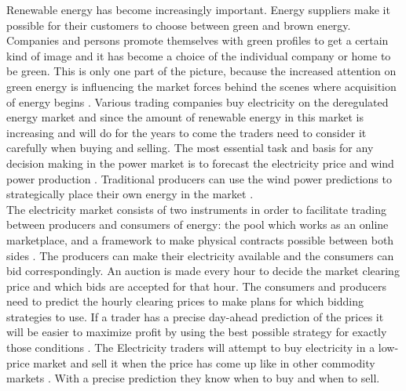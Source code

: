 Renewable energy has become increasingly important. Energy suppliers make it possible for their customers to choose between green and brown energy. Companies and persons promote themselves with green profiles to get a certain kind of image and it has become a choice of the individual company or home to be green. This is only one part of the picture, because the increased attention on green energy is influencing the market forces behind the scenes where acquisition of energy begins \cite{windPowerDanishLiberalized}. Various trading companies buy electricity on the deregulated energy market and since the amount of renewable energy in this market is increasing and will do for the years to come\cite{6, windPowerDanishLiberalized} the traders need to consider it carefully when buying and selling. The most essential task and basis for any decision making in the power market is to forecast the electricity price \cite{pjmForecast} and wind power production \cite{dayAheadImpactOfWindPowerForecasts}. Traditional producers can use the wind power predictions to strategically place their own energy in the market \cite{21}.
\\[0.5cm]
The electricity market consists of two instruments in order to facilitate trading between producers and consumers of energy: the pool which works as an online marketplace, and a framework to make physical contracts possible between both sides \cite{21}. The producers can make their electricity available and the consumers can bid correspondingly. An auction is made every hour to decide the market clearing price and which bids are accepted for that hour. The consumers and producers need to predict the hourly clearing prices to make plans for which bidding strategies to use. If a trader has a precise day-ahead prediction of the prices it will be easier to maximize profit by using the best possible strategy for exactly those conditions \cite{21}. The Electricity traders will attempt to buy electricity in a low-price market and sell it when the price has come up like in
other commodity markets \cite{FIND REF}. With a precise prediction they know when to buy and when to sell. 

